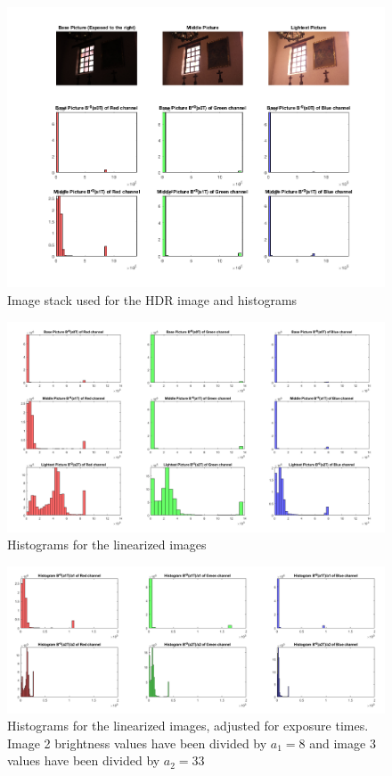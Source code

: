 \documentclass[a4paper]{article}
\begin{document}
\begin{figure}[htb!]
        \includegraphics[width=\textwidth]{imStack.png}
    \caption{Image stack used for the HDR image and histograms} 
    \label{fig:imStack}
\end{figure}
\begin{figure}[htb!]
        \includegraphics[width=\textwidth]{HistogramsLinearizedImages25Bins.png}
    \caption{Histograms for the linearized images} 
    \label{fig:hist1}
\end{figure}

\begin{figure}[htb!]
    \begin{center}
        \includegraphics[width=\textwidth]{HistogramsScaledImages25Bins_RangeModified.png}
	 \end{center}
    \caption{Histograms for the linearized images, adjusted for exposure times.  Image 2 brightness values have been divided by $a_1 = 8$ and image 3 values have been divided by $a_2 = 33$} 
    \label{fig:hist2}
\end{figure}
\end{document}

